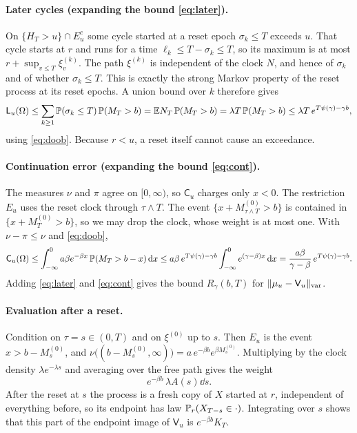 \documentclass[11pt,a4paper]{article}
\begin{document}
\paragraph{Later cycles (expanding the bound \eqref{eq:later}).}
On $\{H_T>u\}\cap E_u^c$ some cycle started at a reset epoch $\sigma_k\le T$ exceeds $u$. That cycle starts at $r$ and runs for a time $\ell_k\le T-\sigma_k\le T$, so its maximum is at most $r+\sup_{v\le T}\xi^{(k)}_v$. The path $\xi^{(k)}$ is independent of the clock $N$, and hence of $\sigma_k$ and of whether $\sigma_k\le T$. This is exactly the strong Markov property of the reset process at its reset epochs. A union bound over $k$ therefore gives
\begin{equation}\label{eq:later}
 \mathsf L_u(\Omega)\le\sum_{k\ge1}\mathbb P(\sigma_k\le T)\,\mathbb P(M_T>b)=\mathbb E N_T\,\mathbb P(M_T>b)=\lambda T\,\mathbb P(M_T>b)\le\lambda T\,e^{T\psi(\gamma)-\gamma b},
\end{equation}
using \eqref{eq:doob}. Because $r<u$, a reset itself cannot cause an exceedance.

\paragraph{Continuation error (expanding the bound \eqref{eq:cont}).}
The measures $\nu$ and $\pi$ agree on $[0,\infty)$, so $\mathsf C_u$ charges only $x<0$. The restriction $E_u$ uses the reset clock through $\tau\wedge T$. The event $\{x+M^{(0)}_{\tau\wedge T}>b\}$ is contained in $\{x+M^{(0)}_T>b\}$, so we may drop the clock, whose weight is at most one. With $\nu-\pi\le\nu$ and \eqref{eq:doob},
\begin{equation}\label{eq:cont}
 \mathsf C_u(\Omega)\le\int_{-\infty}^0a\beta e^{-\beta x}\,\mathbb P(M_T>b-x)\,\mathrm d x
 \le a\beta\,e^{T\psi(\gamma)-\gamma b}\int_{-\infty}^0e^{(\gamma-\beta)x}\,\mathrm d x=\frac{a\beta}{\gamma-\beta}\,e^{T\psi(\gamma)-\gamma b}.
\end{equation}
Adding \eqref{eq:later} and \eqref{eq:cont} gives the bound $R_\gamma(b,T)$ for $\|\mu_u-\mathsf V_u\|_{\mathrm{var}}$.

\paragraph{Evaluation after a reset.}
Condition on $\tau=s\in(0,T)$ and on $\xi^{(0)}$ up to $s$. Then $E_u$ is the event $x>b-M^{(0)}_s$, and $\nu\big((b-M^{(0)}_s,\infty)\big)=a\,e^{-\beta b}e^{\beta M^{(0)}_s}$. Multiplying by the clock density $\lambda e^{-\lambda s}$ and averaging over the free path gives the weight
\begin{equation}\label{eq:resetweight}
 e^{-\beta b}\,\lambda A(s)\dd s .
\end{equation}
After the reset at $s$ the process is a fresh copy of $X$ started at $r$, independent of everything before, so its endpoint has law $\mathbb P_r(X_{T-s}\in\cdot)$. Integrating over $s$ shows that this part of the endpoint image of $\mathsf V_u$ is $e^{-\beta b}K_T$.
\end{document}
